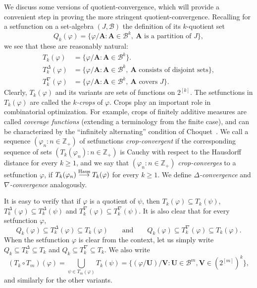 \documentclass[10pt]{article}
\theoremstyle{plain}
\theoremstyle{definition}
\newcommand{\bA}{\mathbf{A}}
\newcommand{\bV}{\mathbf{V}}
\newcommand{\bU}{\mathbf{U}}
\newcommand{\bbZ}{\mathbb{Z}}
\newcommand{\cB}{\mathcal{B}}
\newcommand{\fg}{\varphi}
\newcommand{\Haus}{{\text{\rm Haus}}}
\newcommand{\hto}{\stackrel{\Haus}{\longrightarrow}}
\begin{document}
We discuss some versions of quotient-convergence, which will provide a convenient step in proving the
more stringent quotient-convergence. Recalling for a setfunction on a set-algebra $(J,\cB)$ the definition of its $k$-quotient set
\[
Q_k(\fg)=\{\fg/\bA\colon \bA\in\cB^k,~\text{$\bA$~is a partition of $J$}\},
\]
we see that these are reasonably natural:
\begin{align*}
T_k(\fg)&=\{\fg/\bA\colon \bA\in\cB^k\}.\\%
T_k^\Delta(\fg)&=\{\fg/\bA\colon \bA\in\cB^k,~\bA\text{~consists of disjoint sets}\},\\%
T_k^\nabla(\fg)&=\{\fg/\bA\colon \bA\in\cB^k,~\bA\text{ covers }J\}.%
\end{align*}
Clearly, $T_k(\fg)$ and its variants are sets of functions on $2^{[k]}$. The setfunctions in $T_k(\fg)$ are called the {\it $k$-crops} of $\fg$. Crops play an important role in combinatorial optimization. For example, crops of finitely additive measures are called {\it coverage functions} (extending a terminology from the finite case), and can be characterized by the ``infinitely alternating'' condition of Choquet~\cite{choquet1954theory}. We call a sequence $(\fg_n\colon n\in\bbZ_+)$ of setfunctions {\it crop-convergent} if the corresponding sequence of sets $(T_k(\fg_n)\colon n\in\bbZ_+)$ is Cauchy with respect to the Hausdorff distance for every $k\ge 1$, and we say
that $(\fg_n\colon n\in\bbZ_+)$ {\it crop-converges} to a setfunction $\fg$, if
$T_k(\fg_n)\hto T_k(\fg)$ for every $k\ge 1$. We define {\it $\Delta$-convergence}
and {\it $\nabla$-convergence} analogously.

It is easy to verify that if $\fg$ is a quotient of $\psi$, then
$T_k(\fg)\subseteq T_k(\psi)$, $T_k^\Delta(\fg)\subseteq T_k^\Delta(\psi)$ and
$T_k^\nabla(\fg)\subseteq T_k^\nabla(\psi)$. It is also clear that for every
setfunction $\fg$,
\begin{equation*}\label{EQ:S-SDELTA}
Q_k(\fg) \subseteq T_k^\Delta(\fg)\subseteq T_k(\fg)
\qquad\text{and}\qquad Q_k(\fg) \subseteq T_k^\nabla(\fg)\subseteq T_k(\fg).
\end{equation*}
When the setfunction $\fg$ is clear from the context, let us simply write $Q_k\subseteq T_k^\Delta\subseteq T_k$ and $Q_k\subseteq
T_k^\nabla\subseteq T_k$. We also write 
\[
(T_k\circ T_m)(\fg)=\bigcup_{\psi\in T_m(\fg)} T_k(\psi) = \big\{(\fg/\bU)/\bV\colon \bU\in\cB^m, \bV\in(2^{[m]})^k\big\},
\]
and similarly for the other variants.
\end{document}
